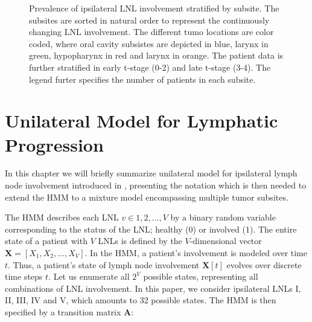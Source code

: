 \documentclass[
  sn-mathphys-num,
]{sn-jnl}
\begin{document}
\begin{figure}


\caption{\label{fig-involvement}Prevalence of ipsilateral LNL
involvement stratified by subsite. The subsites are sorted in natural
order to represent the continuously changing LNL involvement. The
different tumo locations are color coded, where oral cavity subsistes
are depicted in blue, larynx in green, hypopharynx in red and larynx in
orange. The patient data is further stratified in early t-stage (0-2)
and late t-stage (3-4). The legend furter specifies the number of
patients in each subsite.}

\end{figure}%

\section{Unilateral Model for Lymphatic
Progression}\label{sec-unilateral}

In this chapter we will briefly summarize unilateral model for
ipsilateral lymph node involvement introduced in
\citet{ludwig_hidden_2021}, presenting the notation which is then needed
to extend the HMM to a mixture model encompassing multiple tumor
subsites.

The HMM describes each LNL \(v \in 1, 2, ..., V\) by a binary random
variable corresponding to the status of the LNL; healthy (0) or involved
(1). The entire state of a patient with \(V\) LNLs is defined by the
\(V\)-dimensional vector \(\mathbf{X} = [X_1, X_2, ...,X_V]\). In the
HMM, a patient's involvement is modeled over time \(t\). Thus, a
patient's state of lymph node involvement \(\mathbf{X}[t]\) evolves over
discrete time steps \(t\). Let us enumerate all \(2^V\) possible states,
representing all combinations of LNL involvement. In this paper, we
consider ipsilateral LNLs I, II, III, IV and V, which amounts to 32
possible states. The HMM is then specified by a transition matrix
\(\mathbf{A}\):
\end{document}
